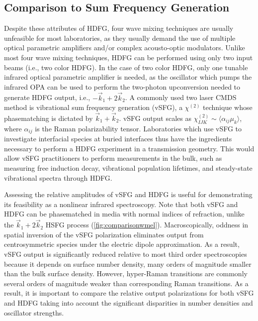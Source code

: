 \documentclass[aip, jcp, reprint, onecolumn]{revtex4-2}
\begin{document}
\subsection{Comparison to Sum Frequency Generation}
Despite these attributes of HDFG, four wave mixing techniques are usually unfeasible for most laboratories, as they usually demand the use of multiple optical parametric amplifiers and/or complex acousto-optic modulators. \cite{RN245}
Unlike most four wave mixing techniques, HDFG can be performed using only two input beams (i.e., two color HDFG).
In the case of two color HDFG, only one tunable infrared optical parametric amplifier is needed, as the oscillator which pumps the infrared OPA can be used to perform the two-photon upconversion needed to generate HDFG output, i.e., $-\vec{k}_1 + 2\vec{k}_2$.
A commonly used two laser CMDS method is vibrational sum frequency generation (vSFG), a $\chi^{(2)}$ technique whose phasematching is dictated by $\vec{k}_1 + \vec{k}_2$.
vSFG output scales as $\chi^{(2)}_{IJK} \sim \langle \alpha_{ij} \mu_k \rangle$, where $\alpha_{ij}$ is the Raman polarizability tensor.
Laboratories which use vSFG to investigate interfacial species at buried interfaces thus have the ingredients necessary to perform a HDFG experiment in a transmission geometry. \cite{Piontek2023_1}
This would allow vSFG practitioners to perform measurements in the bulk, such as measuring free induction decay, vibrational population lifetimes, and steady-state vibrational spectra through HDFG.
 
Assessing the relative amplitudes of vSFG and HDFG is useful for demonstrating its feasibility as a nonlinear infrared spectroscopy. 
Note that both vSFG and HDFG can be phasematched in media with normal indices of refraction, unlike the $\vec{k}_1 + 2\vec{k}_2$ HSFG process (\autoref{fig:comparisonwmel}).\cite{RN120}
Macroscopically, oddness in spatial inversion of the vSFG polarization eliminates output from centrosymmetric species under the electric dipole approximation.\cite{RN132, RN133}
As a result, vSFG output is significantly reduced relative to most third order spectroscopies because it depends on surface number density, many orders of magnitude smaller than the bulk surface density. 
However, hyper-Raman transitions are commonly several orders of magnitude weaker than corresponding Raman transitions.\cite{RN515}
As a result, it is important to compare the relative output polarizations for both vSFG and HDFG taking into account the significant disparities in number densities and oscillator strengths. 
\end{document}
